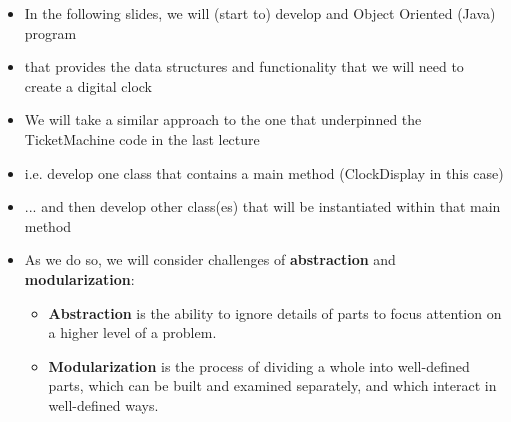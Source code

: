\documentclass{beamer}
\begin{document}
\begin{frame}
\begin{itemize}
\item In the following slides, we will (start to) develop and Object Oriented (Java) program 
\item that provides the data structures and functionality that we will need to create a digital clock
\end{itemize}
\end{frame}


\begin{frame}
\begin{itemize}
\item We will take a similar approach to the one that underpinned the TicketMachine code in the last lecture
\item i.e. develop one class that contains a main method (ClockDisplay in this case)
\item ... and then develop other class(es) that will be instantiated within that main method
\end{itemize}
\end{frame}

\begin{frame}
\begin{itemize}
\item As we do so, we will consider challenges of \textbf{abstraction} and \textbf{modularization}:
\begin{itemize}
\item \textbf{Abstraction} is the ability to ignore details of parts to focus attention on a higher level of a problem.
\item \textbf{Modularization} is the process of dividing a whole into well-defined parts, which can be built and examined
separately, and which interact in well-defined ways.
\end{itemize}
\end{itemize}
\end{frame}
\end{document}
